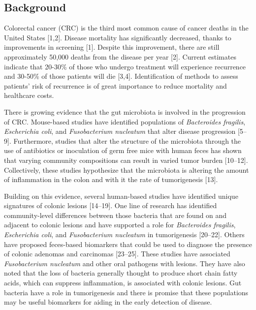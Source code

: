 \documentclass[12pt,]{article}
\begin{document}
\newpage

\linenumbers

\subsection{Background}\label{background}

Colorectal cancer (CRC) is the third most common cause of cancer deaths
in the United States {[}1,2{]}. Disease mortality has significantly
decreased, thanks to improvements in screening {[}1{]}. Despite this
improvement, there are still approximately 50,000 deaths from the
disease per year {[}2{]}. Current estimates indicate that 20-30\% of
those who undergo treatment will experience recurrence and 30-50\% of
those patients will die {[}3,4{]}. Identification of methods to assess
patients' risk of recurrence is of great importance to reduce mortality
and healthcare costs.

There is growing evidence that the gut microbiota is involved in the
progression of CRC. Mouse-based studies have identified populations of
\emph{Bacteroides fragilis}, \emph{Escherichia coli}, and
\emph{Fusobacterium nucleatum} that alter disease progression
{[}5--9{]}. Furthermore, studies that alter the structure of the
microbiota through the use of antibiotics or inoculation of germ free
mice with human feces has shown that varying community compositions can
result in varied tumor burden {[}10--12{]}. Collectively, these studies
hypothesize that the microbiota is altering the amount of inflammation
in the colon and with it the rate of tumorigenesis {[}13{]}.

Building on this evidence, several human-based studies have identified
unique signatures of colonic lesions {[}14--19{]}. One line of research
has identified community-level differences between those bacteria that
are found on and adjacent to colonic lesions and have supported a role
for \emph{Bacteroides fragilis}, \emph{Escherichia coli}, and
\emph{Fusobacterium nucleatum} in tumorigenesis {[}20--22{]}. Others
have proposed feces-based biomarkers that could be used to diagnose the
presence of colonic adenomas and carcinomas {[}23--25{]}. These studies
have associated \emph{Fusobacterium nucleatum} and other oral pathogens
with lesions. They have also noted that the loss of bacteria generally
thought to produce short chain fatty acids, which can suppress
inflammation, is associated with colonic lesions. Gut bacteria have a
role in tumorigenesis and there is promise that these populations may be
useful biomarkers for aiding in the early detection of disease.
\end{document}
